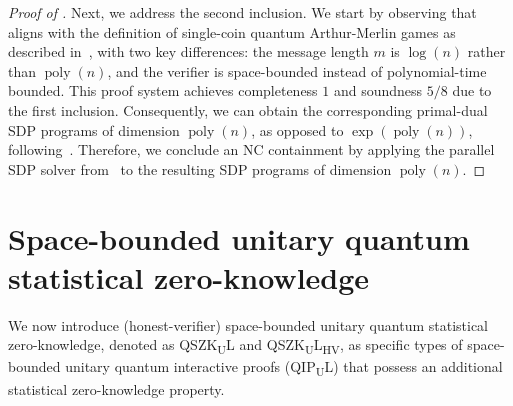 \documentclass[11pt, a4paper]{article}
\numberwithin{equation}{section}
\numberwithin{figure}{section}
\newcommand{\QIPUL}{\texorpdfstring{\textnormal{\textsf{QIP}\textsubscript{\textnormal{U}}\textsf{L}}}\xspace}
\newcommand{\QSZKUL}{\texorpdfstring{\textnormal{\textsf{QSZK}\textsubscript{\textnormal{U}}\textsf{L}}}\xspace}
\newcommand{\QSZKULHV}{\texorpdfstring{\textnormal{\textsf{QSZK}\textsubscript{\textnormal{U}}\textsf{L}}\textsubscript{\textnormal{HV}}}\xspace}
\newcommand{\NC}{\textnormal{\textsf{NC}}\xspace}
\DeclareMathOperator\poly{poly}
\begin{document}
\begin{proof}[Proof of ]
    Next, we address the second inclusion. We start by observing that  aligns with the definition of single-coin quantum Arthur-Merlin games as described in~\cite[Section 2.4]{JJUW11}, with two key differences: the message length $m$ is $\log(n)$ rather than $\poly(n)$, and the verifier is space-bounded instead of polynomial-time bounded. This proof system achieves completeness $1$ and soundness $5/8$ due to the first inclusion. Consequently, we can obtain the corresponding primal-dual SDP programs of dimension $\poly(n)$, as opposed to $\exp(\poly(n))$, following~\cite[Section 2.5]{JJUW11}. Therefore, we conclude an \NC{} containment by applying the parallel SDP solver from~\cite{JJUW11} to the resulting SDP programs of dimension $\poly(n)$. 
\end{proof}

\section{Space-bounded unitary quantum statistical zero-knowledge}

We now introduce (honest-verifier) space-bounded unitary quantum statistical zero-knowledge, denoted as \QSZKUL{} and \QSZKULHV{}, as specific types of space-bounded unitary quantum interactive proofs (\QIPUL{}) that possess an additional statistical zero-knowledge property.
\end{document}
